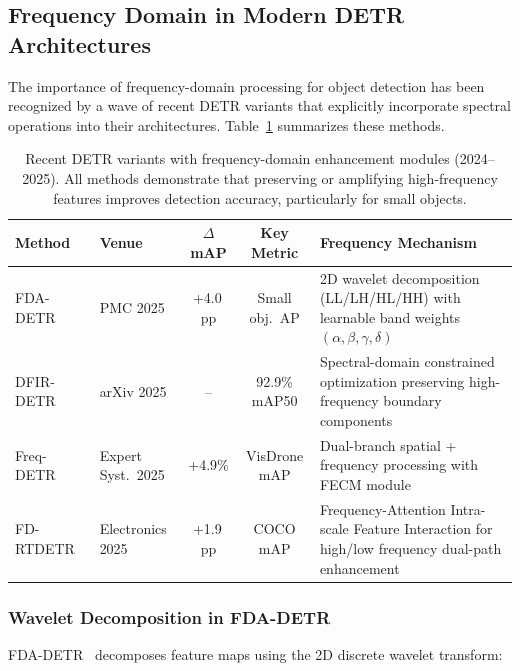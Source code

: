 \subsection{Frequency Domain in Modern DETR Architectures}
\label{sec:detr_frequency}

The importance of frequency-domain processing for object detection has been
recognized by a wave of recent DETR variants that explicitly incorporate
spectral operations into their architectures.
Table~\ref{tab:freq_detr_variants} summarizes these methods.

\begin{table}[t]
\centering
\caption{Recent DETR variants with frequency-domain enhancement modules
         (2024--2025).  All methods demonstrate that preserving or amplifying
         high-frequency features improves detection accuracy, particularly for
         small objects.}
\label{tab:freq_detr_variants}
\begin{tabular}{llccp{5.5cm}}
\toprule
\textbf{Method} & \textbf{Venue} &
    \textbf{$\Delta$mAP} & \textbf{Key Metric} &
    \textbf{Frequency Mechanism} \\
\midrule
FDA-DETR~\cite{fda_detr2025}
    & PMC 2025
    & +4.0\,pp
    & Small obj.\ AP
    & 2D wavelet decomposition (LL/LH/HL/HH) with
      learnable band weights $(\alpha, \beta, \gamma, \delta)$ \\[4pt]
DFIR-DETR~\cite{dfir_detr2025}
    & arXiv 2025
    & --
    & 92.9\% mAP50
    & Spectral-domain constrained optimization preserving
      high-frequency boundary components \\[4pt]
Freq-DETR~\cite{freq_detr2025}
    & Expert Syst.\ 2025
    & +4.9\%
    & VisDrone mAP
    & Dual-branch spatial + frequency processing with
      FECM module \\[4pt]
FD-RTDETR~\cite{fd_rtdetr2025}
    & Electronics 2025
    & +1.9\,pp
    & COCO mAP
    & Frequency-Attention Intra-scale Feature Interaction
      for high/low frequency dual-path enhancement \\
\bottomrule
\end{tabular}
\end{table}

\subsubsection{Wavelet Decomposition in FDA-DETR}

FDA-DETR~\cite{fda_detr2025} decomposes feature maps using the 2D discrete
wavelet transform:

